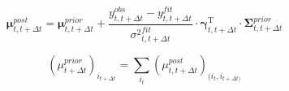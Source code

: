 \documentclass[pdflatex,sn-mathphys-num]{sn-jnl}%
\theoremstyle{thmstyleone}%
\theoremstyle{thmstyletwo}%
\theoremstyle{thmstylethree}%
\begin{document}
\begin{equation}
	\mathbf \mu^{post}_{t, t+ \Delta t}= \mathbf \mu^{prior}_{t, t+ \Delta t} + 
	{\frac {y^{obs}_{t, t+ \Delta t} - y^{fit}_{t, t+ \Delta t}}{{\sigma^2}^{fit}_{t, t+ \Delta t}} }
	\cdot {\mathbf \gamma}^\mathrm{T}_{t, t+ \Delta t} \cdot \mathbf \Sigma^{prior}_{t, t+ \Delta t} 
\end{equation}

\begin{equation}
	( \mu^{prior}_{t+ \Delta t})_{i_{t+\Delta t}} = \sum_{i_t} (\mu^{post}_{t, t+\Delta t})_{(i_t, i_{t+\Delta t)}}
\end{equation}
\begin{equation}
\end{equation}
\end{document}
